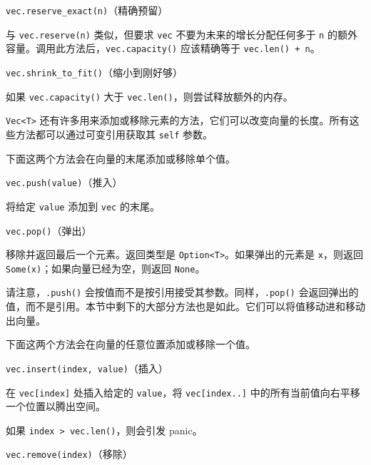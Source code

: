 \begin{mySidenote}
\texttt{vec.reserve\_exact(n)}（精确预留）
\end{mySidenote}

与 \texttt{vec.reserve(n)} 类似，但要求 \texttt{vec} 不要为未来的增长分配任何多于 \texttt{n} 的额外容量。调用此方法后，\texttt{vec.capacity()} 应该精确等于 \texttt{vec.len() + n}。

\begin{myNote}
\texttt{vec.shrink\_to\_fit()}（缩小到刚好够）
\end{myNote}

如果 \texttt{vec.capacity()} 大于 \texttt{vec.len()}，则尝试释放额外的内存。

\texttt{Vec<T>} 还有许多用来添加或移除元素的方法，它们可以改变向量的长度。所有这些方法都可以通过可变引用获取其 \texttt{self} 参数。

下面这两个方法会在向量的末尾添加或移除单个值。

\begin{mySidenote}
\texttt{vec.push(value)}（推入）
\end{mySidenote}

将给定 \texttt{value} 添加到 \texttt{vec} 的末尾。

\begin{mySidenote}
\texttt{vec.pop()}（弹出）
\end{mySidenote}

移除并返回最后一个元素。返回类型是 \texttt{Option<T>}。如果弹出的元素是 \texttt{x}，则返回 \texttt{Some(x)}；如果向量已经为空，则返回 \texttt{None}。

请注意，\texttt{.push()} 会按值而不是按引用接受其参数。同样，\texttt{.pop()} 会返回弹出的值，而不是引用。本节中剩下的大部分方法也是如此。它们可以将值移动进和移动出向量。

下面这两个方法会在向量的任意位置添加或移除一个值。

\begin{mySidenote}
\texttt{vec.insert(index, value)}（插入）
\end{mySidenote}

在 \texttt{vec[index]} 处插入给定的 \texttt{value}，将 \texttt{vec[index..]} 中的所有当前值向右平移一个位置以腾出空间。

如果 \texttt{index > vec.len()}，则会引发 panic。

\begin{mySidenote}
\texttt{vec.remove(index)}（移除）
\end{mySidenote}

